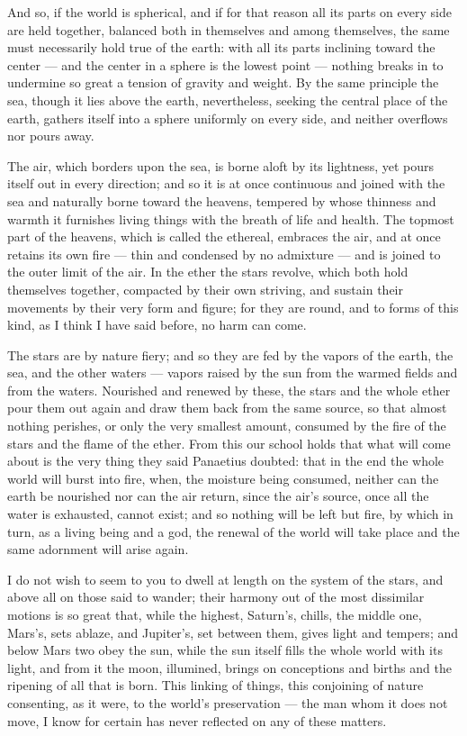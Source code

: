  And so, if the world is spherical, and if for that reason all its parts on every side are held together, balanced both in themselves and among themselves, the same must necessarily hold true of the earth: with all its parts inclining toward the center — and the center in a sphere is the lowest point — nothing breaks in to undermine so great a tension of gravity and weight. By the same principle the sea, though it lies above the earth, nevertheless, seeking the central place of the earth, gathers itself into a sphere uniformly on every side, and neither overflows nor pours away.

 The air, which borders upon the sea, is borne aloft by its lightness, yet pours itself out in every direction; and so it is at once continuous and joined with the sea and naturally borne toward the heavens, tempered by whose thinness and warmth it furnishes living things with the breath of life and health. The topmost part of the heavens, which is called the ethereal, embraces the air, and at once retains its own fire — thin and condensed by no admixture — and is joined to the outer limit of the air. In the ether the stars revolve, which both hold themselves together, compacted by their own striving, and sustain their movements by their very form and figure; for they are round, and to forms of this kind, as I think I have said before, no harm can come.

 The stars are by nature fiery; and so they are fed by the vapors of the earth, the sea, and the other waters — vapors raised by the sun from the warmed fields and from the waters. Nourished and renewed by these, the stars and the whole ether pour them out again and draw them back from the same source, so that almost nothing perishes, or only the very smallest amount, consumed by the fire of the stars and the flame of the ether. From this our school holds that what will come about is the very thing they said Panaetius doubted: that in the end the whole world will burst into fire, when, the moisture being consumed, neither can the earth be nourished nor can the air return, since the air's source, once all the water is exhausted, cannot exist; and so nothing will be left but fire, by which in turn, as a living being and a god, the renewal of the world will take place and the same adornment will arise again.

 I do not wish to seem to you to dwell at length on the system of the stars, and above all on those said to wander; their harmony out of the most dissimilar motions is so great that, while the highest, Saturn's, chills, the middle one, Mars's, sets ablaze, and Jupiter's, set between them, gives light and tempers; and below Mars two obey the sun, while the sun itself fills the whole world with its light, and from it the moon, illumined, brings on conceptions and births and the ripening of all that is born. This linking of things, this conjoining of nature consenting, as it were, to the world's preservation — the man whom it does not move, I know for certain has never reflected on any of these matters.

